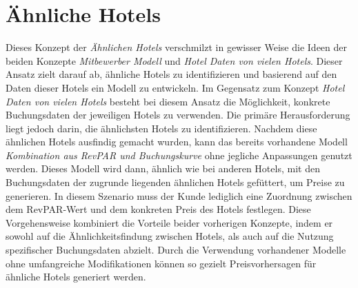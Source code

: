 \section{Ähnliche Hotels}
\label{sec:aehnliche_hotels}
Dieses Konzept der \emph{Ähnlichen Hotels} verschmilzt in gewisser Weise die Ideen der beiden Konzepte \emph{Mitbewerber Modell} und \emph{Hotel Daten von vielen Hotels}. Dieser Ansatz zielt darauf ab, ähnliche Hotels zu identifizieren und basierend auf den Daten dieser Hotels ein Modell zu entwickeln.
\newline
\newline
Im Gegensatz zum Konzept \emph{Hotel Daten von vielen Hotels} besteht bei diesem Ansatz die Möglichkeit, konkrete Buchungsdaten der jeweiligen Hotels zu verwenden. Die primäre Herausforderung liegt jedoch darin, die ähnlichsten Hotels zu identifizieren. Nachdem diese ähnlichen Hotels ausfindig gemacht wurden, kann das bereits vorhandene Modell \emph{Kombination aus RevPAR und Buchungskurve} ohne jegliche Anpassungen genutzt werden.
\newline
\newline
Dieses Modell wird dann, ähnlich wie bei anderen Hotels, mit den Buchungsdaten der zugrunde liegenden ähnlichen Hotels gefüttert, um Preise zu generieren. In diesem Szenario muss der Kunde lediglich eine Zuordnung zwischen dem RevPAR-Wert und dem konkreten Preis des Hotels festlegen.
\newline
\newline
Diese Vorgehensweise kombiniert die Vorteile beider vorherigen Konzepte, indem er sowohl auf die Ähnlichkeitsfindung zwischen Hotels, als auch auf die Nutzung spezifischer Buchungsdaten abzielt. Durch die Verwendung vorhandener Modelle ohne umfangreiche Modifikationen können so gezielt Preisvorhersagen für ähnliche Hotels generiert werden.